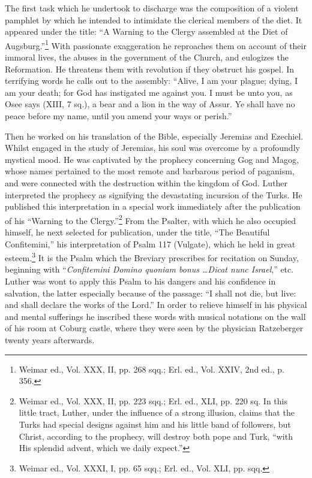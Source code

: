 The first task which he undertook to discharge was the composition
of a violent pamphlet by which he intended to intimidate the clerical
members of the diet. It appeared under the title: “A Warning to the
Clergy assembled at the Diet of Augsburg.”\footnote
{Weimar ed., Vol. XXX, II, pp. 268 sqq.; Erl. ed., Vol. XXIV, 2nd ed., p. 356.}
With passionate exaggeration
he reproaches them on account of their immoral lives, the
abuses in the government of the Church, and eulogizes the Reformation.
He threatens them with revolution if they obstruct his gospel.
In terrifying words he calls out to the assembly: “Alive, I am your
plague; dying, I am your death; for God has instigated me against you.
I must be unto you, as Osee says (XIII, 7 sq.), a bear and a lion in the
way of Assur. Ye shall have no peace before my name, until you
amend your ways or perish.”

Then he worked on his translation of the Bible, especially Jeremias
and Ezechiel. Whilst engaged in the study of Jeremias, his soul was
overcome by a profoundly mystical mood. He was captivated by the
prophecy concerning Gog and Magog, whose names pertained to the
most remote and barbarous period of paganism, and were connected
with the destruction within the kingdom of God. Luther interpreted
the prophecy as signifying the devastating incursion of the Turks. He
published this interpretation in a special work immediately after the
publication of his “Warning to the Clergy.”\footnote
{Weimar ed., Vol. XXX, II, pp. 223 sqq.; Erl. ed., XLI, pp. 220 sq. In this little tract,
Luther, under the influence of a strong illusion, claims that the Turks had special designs
against him and his little band of followers, but Christ, according to the prophecy, will
destroy both pope and Turk, “with His splendid advent, which we daily expect.”}
From the Psalter, with
which he also occupied himself, he next selected for publication, under
the title, “The Beautiful Confitemini,” his interpretation of Psalm 117
(Vulgate), which he held in great esteem.\footnote
{Weimar ed., Vol. XXXI, I, pp. 65 sqq.; Erl. ed., Vol. XLI, pp. sqq.}
It is the Psalm which the
Breviary prescribes for recitation on Sunday, beginning with “\textit{Confitemini
Domino quoniam bonus \dots Dicat nunc Israel},” etc. Luther
was wont to apply this Psalm to his dangers and his confidence in
salvation, the latter especially because of the passage: “I shall not die,
but live: and shall declare the works of the Lord.” In order to relieve
himself in his physical and mental sufferings he inscribed these words
with musical notations on the wall of his room at Coburg castle,
where they were seen by the physician Ratzeberger twenty years
afterwards.


